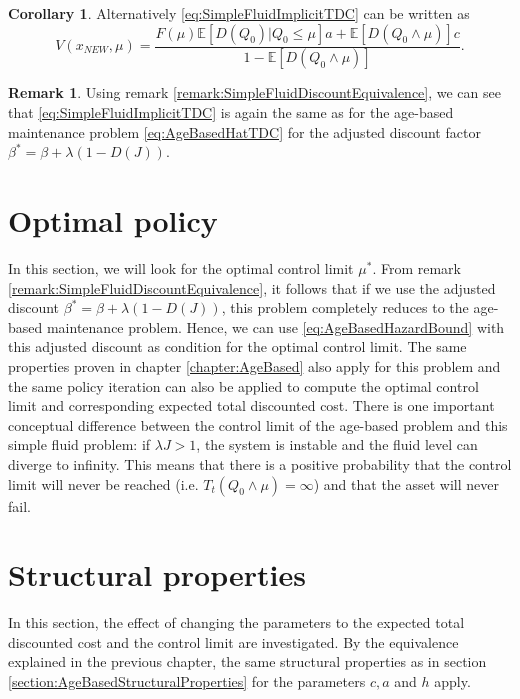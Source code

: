 \documentclass[a4paper]{thesis}
\theoremstyle{definition}
\newtheorem{remark}{Remark}[chapter]
\newtheorem{corollary}{Corollary}[chapter]
\begin{document}
\begin{corollary}
	Alternatively \eqref{eq:SimpleFluidImplicitTDC} can be written as
	\begin{equation}\label{eq:SimpleFluidExplicitTDC}
	V(x_{NEW},\mu)=\frac{F(\mu)\mathbb{E}[D(Q_0)|Q_0\leq \mu]a+\mathbb{E}[D(Q_0\wedge\mu)]c}{1-\mathbb{E}[D(Q_0\wedge\mu)]}.
	\end{equation}
\end{corollary}

\begin{remark}\label{remark:SimpleFluidTDCEquivalence}
	Using remark \ref{remark:SimpleFluidDiscountEquivalence}, we can see that \eqref{eq:SimpleFluidImplicitTDC} is again the same as for the age-based maintenance problem \eqref{eq:AgeBasedHatTDC} for the adjusted discount factor $\beta^*=\beta+\lambda(1-D(J))$.
\end{remark} \section{Optimal policy}
In this section, we will look for the optimal control limit $\mu^*$.
From remark \ref{remark:SimpleFluidDiscountEquivalence}, it follows that if we use the adjusted discount $\beta^*=\beta+\lambda(1-D(J))$, this problem completely reduces to the age-based maintenance problem.
Hence, we can use \eqref{eq:AgeBasedHazardBound} with this adjusted discount as condition for the optimal control limit.
The same properties proven in chapter \ref{chapter:AgeBased} also apply for this problem and the same policy iteration can also be applied to compute the optimal control limit and corresponding expected total discounted cost.
There is one important conceptual difference between the control limit of the age-based problem and this simple fluid problem:
if $\lambda J>1$, the system is instable and the fluid level can diverge to infinity.
This means that there is a positive probability that the control limit will never be reached (i.e. $T_t(Q_0\wedge\mu)=\infty$) and that the asset will never fail. \section{Structural properties}\label{section:SimpleStructuralProperties}
In this section, the effect of changing the parameters to the expected total discounted cost and the control limit are investigated.
By the equivalence explained in the previous chapter, the same structural properties as in section \ref{section:AgeBasedStructuralProperties} for the parameters $c,a$ and $h$ apply.
\end{document}
